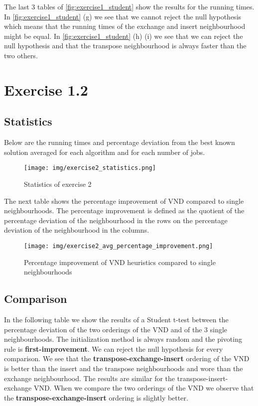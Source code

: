 \documentclass[a4paper,10pt]{article}
\begin{document}
The last 3 tables of \ref{fig:exercise1_student} show the results for the running times. In \ref{fig:exercise1_student} (g) we see that we cannot reject the null hypothesis which means that the running times of the exchange and insert neighbourhood might be equal. In \ref{fig:exercise1_student} (h) (i) we see that we can reject the null hypothesis and that the transpose neighbourhood is always faster than the two others.

\section{Exercise 1.2}

\subsection{Statistics}

Below are the running times and percentage deviation from the best known solution averaged for each algorithm and for each number of jobs.

\begin{figure}[H]
	\centering
	\caption{Statistics of exercise 2}
	\texttt{[image: img/exercise2\_statistics.png]}
\end{figure}


The next table shows the percentage improvement of VND compared to single neighbourhoods. The percentage improvement is defined as the quotient of the percentage deviation of the neighbourhood in the rows on the percentage deviation of the neighbourhood in the columns.
\begin{figure}[H]
	\centering
	\caption{Percentage improvement of VND heuristics compared to single neighbourhoods}
	\texttt{[image: img/exercise2\_avg\_percentage\_improvement.png]}
\end{figure}

\subsection{Comparison}

In the following table we show the results of a Student t-test between the percentage deviation of the two orderings of the VND and of the 3 single neighbourhoods. The initialization method is always random and the pivoting rule is \textbf{first-improvement}. We can reject the null hypothesis for every comparison. We see that the \textbf{transpose-exchange-insert} ordering of the VND is better than the insert and the transpose neighbourhoods and wore than the exchange neighbourhood. The results are similar for the transpose-insert-exchange VND. When we compare the two orderings of the VND we observe that the \textbf{transpose-exchange-insert} ordering is slightly better. \\
\end{document}
